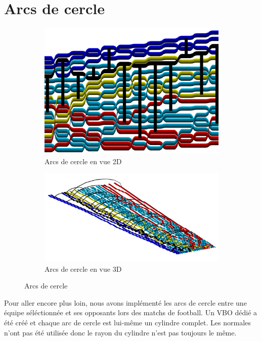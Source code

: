 \documentclass[a4paper,10.5pt]{report}
\begin{document}
    \section{Arcs de cercle}\label{sec:arcs-de-cercle}
    \begin{figure}[h!]
        \begin{subfigure}[t]{.4\textwidth}
            \includegraphics[width = .95\linewidth]{../arc2D.png}
            \caption{Arcs de cercle en vue 2D}
        \end{subfigure}
        \begin{subfigure}[t]{.7\textwidth}
            \includegraphics[width = .95\linewidth]{../arc3D.png}
            \caption{Arcs de cercle en vue 3D}
        \end{subfigure}
        \caption{Arcs de cercle}\label{arc}
    \end{figure}
    \newpage

    Pour aller encore plus loin, nous avons implémenté les arcs de cercle entre une équipe séléctionnée et ses opposants lors des matchs de football.
    Un VBO dédié a été créé et chaque arc de cercle est lui-même un cylindre complet.
    Les normales n'ont pas été utilisée donc le rayon du cylindre n'est pas toujours le même.
\end{document}
